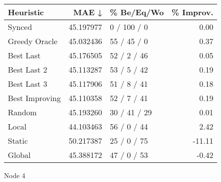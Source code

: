 \begin{tabular}{lrlr}
\toprule
      Heuristic &      MAE ↓ &    \% Be/Eq/Wo & \% Improv. \\
\midrule
         Synced &  45.197977 &   0 / 100 / 0 &      0.00 \\
  Greedy Oracle &  45.032436 &   55 / 45 / 0 &      0.37 \\
      Best Last &  45.176505 &   52 / 2 / 46 &      0.05 \\
    Best Last 2 &  45.113287 &   53 / 5 / 42 &      0.19 \\
    Best Last 3 &  45.117906 &   51 / 8 / 41 &      0.18 \\
 Best Improving &  45.110358 &   52 / 7 / 41 &      0.19 \\
         Random &  45.193260 &  30 / 41 / 29 &      0.01 \\
          Local &  44.103463 &   56 / 0 / 44 &      2.42 \\
         Static &  50.217387 &   25 / 0 / 75 &    -11.11 \\
         Global &  45.388172 &   47 / 0 / 53 &     -0.42 \\
\bottomrule
\end{tabular}
\caption{Node 4}
\label{tab:non_lr005_le1_bs2_4}

